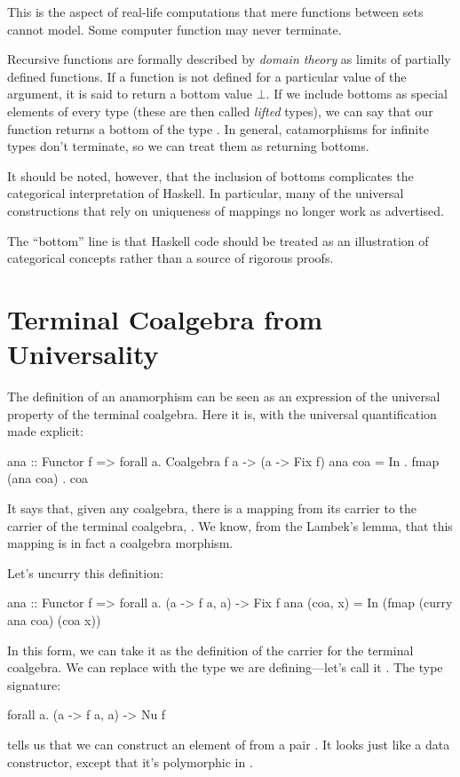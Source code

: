 \documentclass[DaoFP]{subfiles}
\begin{document}
This is the aspect of real-life computations that mere functions between sets cannot model. Some computer function may never terminate. 

Recursive functions are formally described by \emph{domain theory} as limits of partially defined functions. If a function is not defined for a particular value of the argument, it is said to return a bottom value $\bot$. If we include bottoms as special elements of every type (these are then called \emph{lifted} types), we can say that our function  returns a bottom of the type . In general, catamorphisms for infinite types don't terminate, so we can treat them as returning bottoms.

It should be noted, however, that the inclusion of bottoms complicates the categorical interpretation of Haskell. In particular, many of the universal constructions that rely on uniqueness of mappings no longer work as advertised.

The ``bottom'' line is that Haskell code should be treated as an illustration of categorical concepts rather than a source of rigorous proofs.

\section{Terminal Coalgebra from Universality}

The definition of an anamorphism can be seen as an expression of the universal property of the terminal coalgebra. Here it is, with the universal quantification made explicit:
 \begin{haskell}
ana :: Functor f => forall a. Coalgebra f a -> (a -> Fix f)
ana coa = In . fmap (ana coa) . coa 
\end{haskell}
It says that, given any coalgebra, there is a mapping from its carrier to the carrier of the terminal coalgebra, . We know, from the Lambek's lemma, that this mapping is in fact a coalgebra morphism.

Let's uncurry this definition:
\begin{haskell}
ana :: Functor f => forall a. (a -> f a, a) -> Fix f
ana (coa, x) = In (fmap (curry ana coa) (coa x))
\end{haskell}
In this form, we can take it as the definition of the carrier for the terminal coalgebra. We can replace  with the type we are defining---let's call it . The type signature:
\begin{haskell}
forall a. (a -> f a, a) -> Nu f
\end{haskell}
tells us that we can construct an element of  from a pair . It looks just like a data constructor, except that it's polymorphic in . 
\end{document}
